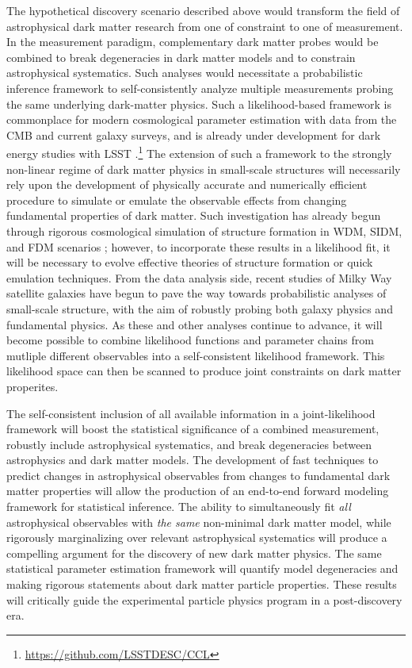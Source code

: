 The hypothetical discovery scenario described above would transform the field of astrophysical dark matter research from one of constraint to one of measurement.
In the measurement paradigm, complementary dark matter probes would be combined to break degeneracies in dark matter models and to constrain astrophysical systematics.
Such analyses would necessitate a probabilistic inference framework to self-consistently analyze multiple measurements probing the same underlying dark-matter physics. 
Such a likelihood-based framework is commonplace for modern cosmological parameter estimation with data from the CMB and current galaxy surveys, and is already under development for dark energy studies with LSST \citep{DESC:CCL}.\footnote{\url{https://github.com/LSSTDESC/CCL}} 
The extension of such a framework to the strongly non-linear regime of dark matter physics in small-scale structures will necessarily rely upon the development of physically accurate and numerically efficient procedure to simulate or emulate the observable effects from changing fundamental properties of dark matter.
Such investigation has already begun through rigorous cosmological simulation of structure formation in WDM, SIDM, and FDM scenarios \citep[\eg][]{Lovell:2013ola,Dooley:2016ajo,1807.06018,1811.11791}; however, to incorporate these results in a likelihood fit, it will be necessary to evolve effective theories of structure formation \citep[\eg][]{Cyr-Racine:2015ihg} or quick emulation techniques.
From the data analysis side, recent studies of Milky Way satellite galaxies \citep[\eg][]{Jethwa:2018,Nadler:2018} have begun to pave the way towards probabilistic analyses of small-scale structure, with the aim of robustly probing both galaxy physics and fundamental physics.
As these and other analyses continue to advance, it will become possible to combine likelihood functions and parameter chains from mutliple different observables into a self-consistent likelihood framework. 
This likelihood space can then be scanned to produce joint constraints on dark matter properites.

The self-consistent inclusion of all available information in a joint-likelihood framework will boost the statistical significance of a combined measurement, robustly include astrophysical systematics, and break degeneracies between astrophysics and dark matter models.
The development of fast techniques to predict changes in astrophysical observables from changes to fundamental dark matter properties will allow the production of an end-to-end forward modeling framework for statistical inference.
The ability to simultaneously fit \textit{all} astrophysical observables with \emph{the same} non-minimal dark matter model, while rigorously marginalizing over relevant astrophysical systematics will produce a compelling argument for the discovery of new dark matter physics.
The same statistical parameter estimation framework will quantify model degeneracies and making rigorous statements about dark matter particle properties.
These results will critically guide the experimental particle physics program in a post-discovery era.

